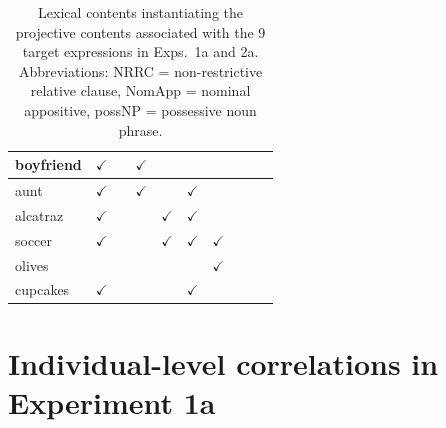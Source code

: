 \documentclass[11pt,fleqn]{article}
\newcommand{\6}{\mbox{$[\hspace*{-.6mm}[$}}
\newcommand{\9}{\mbox{$]\hspace*{-.6mm}]$}}
\begin{document}
\begin{table}[h!]
\begin{center}
\begin{tabular}{l|ccccccccc}
boyfriend & $\checkmark$ & & $\checkmark$ & & & & & &  \\

\hline

aunt & $\checkmark$ & & $\checkmark$ & & $\checkmark$ & & & &  \\

\hline

alcatraz & $\checkmark$ & & & $\checkmark$ & $\checkmark$ & & & &  \\

\hline

soccer & $\checkmark$ & & & $\checkmark$ & $\checkmark$ & $\checkmark$ & & &  \\

\hline

olives & & & & & & $\checkmark$ & & &  \\

\hline

cupcakes & $\checkmark$ & & & & $\checkmark$ & & & &  \\

\hline

\end{tabular}
\end{center}
\caption{Lexical contents instantiating the projective contents associated with the 9 target expressions in Exps.~1a and 2a. Abbreviations: NRRC = non-restrictive relative clause, NomApp = nominal appositive, possNP = possessive noun phrase.}\label{t-trigger-content-pairs}
\end{table}


\clearpage

\section{Individual-level correlations in Experiment 1a}\label{a-corr}
\end{document}
